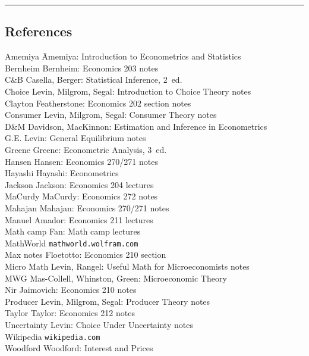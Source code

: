 \documentclass[8pt,letterpaper, landscape]{extarticle} %
\begin{document}
\hrule %
\begin{multicols}{2}
\section{References}
\begin{tabbing}
Amemiya \quad \quad \= Amemiya: Introduction to Econometrics and Statistics \\
Bernheim \> Bernheim: Economics 203 notes \\
C\&B \> Casella, Berger: Statistical Inference, 2~ed. \\
Choice \> Levin, Milgrom, Segal: Introduction to Choice Theory notes \\
Clayton \> Featherstone: Economics 202 section notes \\
Consumer \> Levin, Milgrom, Segal: Consumer Theory notes \\
D\&M \> Davidson, MacKinnon: Estimation and Inference in Econometrics \\
G.E. \> Levin: General Equilibrium notes \\
Greene \> Greene: Econometric Analysis, 3~ed. \\
Hansen \> Hansen: Economics 270\slash 271 notes \\
Hayashi \> Hayashi: Econometrics \\
Jackson \> Jackson: Economics 204 lectures \\
MaCurdy \> MaCurdy: Economics 272 notes \\
Mahajan \> Mahajan: Economics 270\slash 271 notes \\
Manuel \> Amador: Economics 211 lectures \\
Math camp \> Fan: Math camp lectures \\
MathWorld \>  \texttt{mathworld.wolfram.com} \\
Max notes \> Floetotto: Economics 210 section \\
Micro Math \>  Levin, Rangel: Useful Math for Microeconomists notes  \\
MWG \> Mas-Collell, Whinston, Green: Microeconomic Theory \\
Nir \> Jaimovich: Economics 210 notes \\
Producer \> Levin, Milgrom, Segal: Producer Theory notes \\
Taylor \> Taylor: Economics 212 notes \\
Uncertainty \> Levin: Choice Under Uncertainty notes \\
Wikipedia \> \texttt{wikipedia.com} \\
Woodford \> Woodford: Interest and Prices
\end{tabbing}
\end{multicols}
\end{document}
